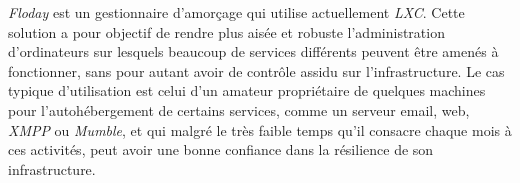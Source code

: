 \emph{Floday} est un gestionnaire d'amorçage qui utilise actuellement \emph{LXC}.
Cette solution a pour objectif de rendre plus aisée et robuste l'administration d'ordinateurs sur lesquels beaucoup de services différents peuvent être amenés à fonctionner, sans pour autant avoir de contrôle assidu sur l'infrastructure.
Le cas typique d'utilisation est celui d'un amateur propriétaire de quelques machines pour l'autohébergement de certains services, comme un serveur email, web, \emph{XMPP} ou \emph{Mumble}, et qui malgré le très faible temps qu'il consacre chaque mois à ces activités, peut avoir une bonne confiance dans la résilience de son infrastructure.
